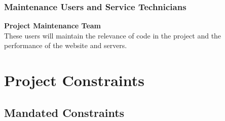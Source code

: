 \documentclass[11pt, oneside]{article}   	%
\begin{document}
\subsubsection{Maintenance Users and Service Technicians}
\textbf{Project Maintenance Team}\\
These users will maintain the relevance of code in the project and the performance of the website and servers.


\newpage
\section{Project Constraints}
\subsection{Mandated Constraints}
\end{document}
